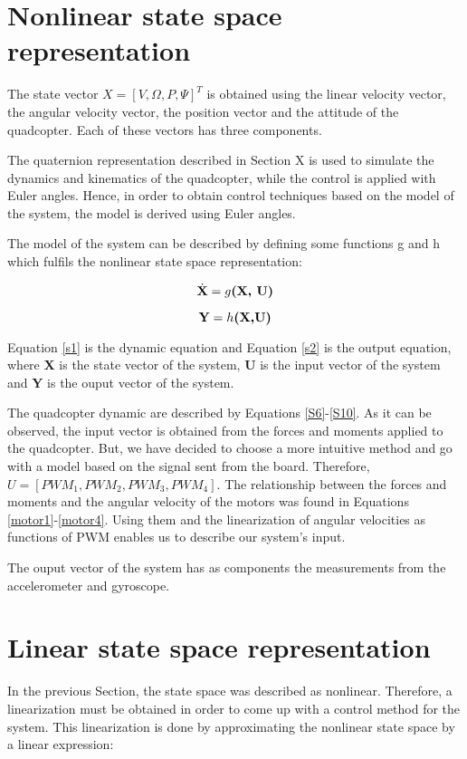 \section{Nonlinear state space representation}
The state vector $X=[V, \Omega, P, \Psi]^{T}$ is obtained using the linear velocity vector, the angular velocity vector, the position vector and the attitude of the quadcopter. Each of these vectors has three components.

The quaternion representation described in Section X is used to simulate the dynamics and kinematics of the quadcopter, while the control is applied with Euler angles. Hence, in order to obtain control techniques based on the model of the system, the model is derived using Euler angles.

The model of the system can be described by defining some functions g and h which fulfils the nonlinear state space representation:

\begin{equation}
\label{s1} 
 	\dot{\textbf{X}}=g\textbf{(X, U)} \\
 \end{equation}

\begin{equation}
\label{s2} 
 	\textbf{Y}=h\textbf{(X,U)} \\
 \end{equation}
 
Equation \ref{s1} is the dynamic equation and Equation \ref{s2}  is the output equation, where \textbf{X} is the state vector of the system, \textbf{U} is the input vector of the system and \textbf{Y} is the ouput vector of the system.

The quadcopter dynamic are described by Equations \ref{S6}-\ref{S10}. As it can be observed, the input vector is obtained from the forces and moments applied to the quadcopter. But, we have decided to choose a more intuitive method and go with a model based on the signal sent from the board. Therefore, $U=[PWM_{1}, PWM_{2}, PWM_{3}, PWM_{4}]$. The relationship between the forces and moments and the angular velocity of the motors was found in Equations \ref{motor1}-\ref{motor4}. Using them and the linearization of angular velocities as functions of PWM enables us to describe our system's input.

The ouput vector of the system has as components the measurements from the accelerometer and gyroscope.

\section{Linear state space representation}
In the previous Section, the state space was described as nonlinear. Therefore, a linearization must be obtained in order to come up with a control method for the system. This linearization is done by approximating the nonlinear state space by a linear expression:

